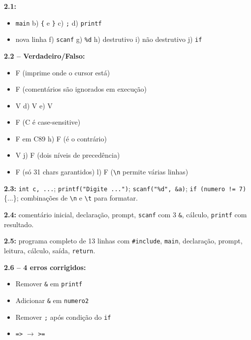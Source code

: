 \documentclass[12pt,a4paper]{article}
\begin{document}
\begin{tcolorbox}[colback=deitellightblue,colframe=deitelblue,title={\bfseries\large Respostas Resumidas}]

\textbf{2.1:}
\begin{itemize}[noitemsep]
  \item[a)] \texttt{main} \quad b) \texttt{\{} e \texttt{\}} \quad c) \texttt{;}
  \quad d) \texttt{printf}
  \item[e)] nova linha \quad f) \texttt{scanf} \quad g) \texttt{\%d}
  \quad h) destrutivo \quad i) não destrutivo \quad j) \texttt{if}
\end{itemize}

\medskip\textbf{2.2 -- Verdadeiro/Falso:}
\begin{itemize}[noitemsep]
  \item[a)] F (imprime onde o cursor está)
  \item[b)] F (comentários são ignorados em execução)
  \item[c)] V \quad d) V \quad e) V
  \item[f)] F (C é case-sensitive)
  \item[g)] F em C89 \quad h) F (é o contrário)
  \item[i)] V \quad j) F (dois níveis de precedência)
  \item[k)] F (só 31 chars garantidos) \quad l) F (\texttt{\textbackslash n} permite várias linhas)
\end{itemize}

\medskip\textbf{2.3:} \texttt{int c, ...}; \texttt{printf("Digite ...")}; 
\texttt{scanf("\%d", \&a)}; \texttt{if (numero != 7)} \{...\}; combinações de
\texttt{\textbackslash n} e \texttt{\textbackslash t} para formatar.

\medskip\textbf{2.4:} comentário inicial, declaração, prompt, \texttt{scanf}
com 3 \texttt{\&}, cálculo, \texttt{printf} com resultado.

\medskip\textbf{2.5:} programa completo de 13 linhas com \texttt{\#include},
\texttt{main}, declaração, prompt, leitura, cálculo, saída, \texttt{return}.

\medskip\textbf{2.6 -- 4 erros corrigidos:}
\begin{itemize}[noitemsep]
  \item[a)] Remover \texttt{\&} em \texttt{printf}
  \item[b)] Adicionar \texttt{\&} em \texttt{numero2}
  \item[c)] Remover \texttt{;} após condição do \texttt{if}
  \item[d)] \texttt{=>} $\to$ \texttt{>=}
\end{itemize}

\end{tcolorbox}
\end{document}
